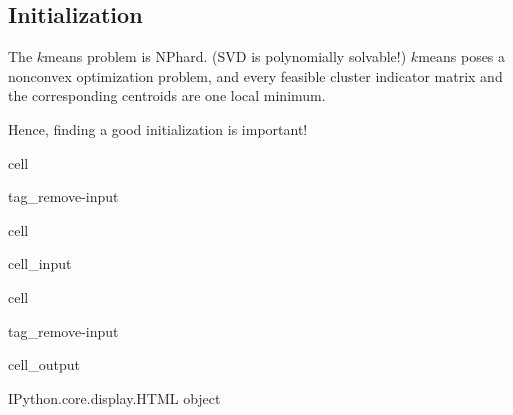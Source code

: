 \documentclass[letterpaper,10pt,english]{jupyterBook}
\begin{document}
\subsection{Initialization}
\label{\detokenize{clustering_k_means_mf:initialization}}
\sphinxAtStartPar
The \(k\)\sphinxhyphen{}means problem is NP\sphinxhyphen{}hard. (SVD is polynomially solvable!)
\(k\)\sphinxhyphen{}means poses a nonconvex optimization problem, and every feasible cluster indicator matrix and the corresponding centroids are one local minimum.

\sphinxAtStartPar
Hence, finding a good initialization is important!

\begin{sphinxuseclass}{cell}
\begin{sphinxuseclass}{tag_remove-input}
\end{sphinxuseclass}
\end{sphinxuseclass}
\begin{sphinxuseclass}{cell}\begin{sphinxVerbatimInput}

\begin{sphinxuseclass}{cell_input}
\begin{sphinxVerbatim}[commandchars=\\\{\}]
 
  
    \PYG{p}{[}        \PYG{p}{]}
\end{sphinxVerbatim}

\end{sphinxuseclass}\end{sphinxVerbatimInput}

\end{sphinxuseclass}
\begin{sphinxuseclass}{cell}
\begin{sphinxuseclass}{tag_remove-input}\begin{sphinxVerbatimOutput}

\begin{sphinxuseclass}{cell_output}
\begin{sphinxVerbatim}[commandchars=\\\{\}]
\PYGZlt{}IPython.core.display.HTML object\PYGZgt{}
\end{sphinxVerbatim}

\end{sphinxuseclass}\end{sphinxVerbatimOutput}

\end{sphinxuseclass}
\end{sphinxuseclass}
\end{document}
